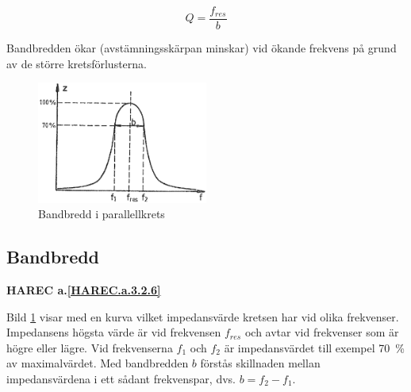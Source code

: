 \[Q = \frac{f_{res}}{b}\]

Bandbredden ökar (avstämningsskärpan minskar) vid ökande frekvens på grund av de
större kretsförlusterna.

\begin{figure}
\includegraphics[width=0.5\textwidth]{images/cropped_pdfs/bild_2_3-21.pdf}
\caption{Bandbredd i parallellkrets}
\label{fig:BildII3-21}
\end{figure}

\subsection{Bandbredd}
\textbf{HAREC a.\ref{HAREC.a.3.2.6}\label{myHAREC.a.3.2.6}}

Bild \ref{fig:BildII3-21} visar med en kurva vilket impedansvärde kretsen har
vid olika frekvenser.
Impedansens högsta värde är vid frekvensen \(f_{res}\) och avtar vid frekvenser
som är högre eller lägre.
Vid frekvenserna \(f_1\) och \(f_2\) är impedansvärdet till exempel 70~\% av
maximalvärdet.
Med bandbredden \(b\) förstås skillnaden mellan impedansvärdena i ett sådant
frekvenspar, dvs. \(b = f_2 - f_1\).

